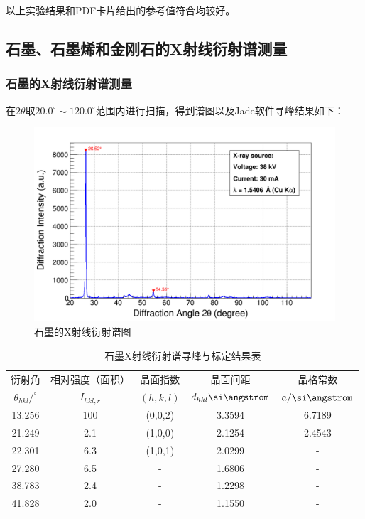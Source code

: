 \documentclass{thuemp}
\begin{document}
以上实验结果和PDF卡片给出的参考值符合均较好。

\subsection{石墨、石墨烯和金刚石的X射线衍射谱测量}

\subsubsection{石墨的X射线衍射谱测量}

在$2\theta$取$20.0^\circ \sim 120.0^\circ$范围内进行扫描，得到谱图以及Jade软件寻峰结果如下：

\begin{figure}[H]
    \centering
    \includegraphics[width=0.8\linewidth]{../Data/C-Graphite-multi.png}
    \caption{石墨的X射线衍射谱图}
    \label{fig:graphite_xrd}
\end{figure}

\begin{table}
    \centering
    \captionnamefont{\wuhao\bf\heiti}
    \captiontitlefont{\wuhao\bf\heiti}
    \caption{石墨X射线衍射谱寻峰与标定结果表}
    \label{tab:graphite_xrd}
    \liuhao
    \begin{tabular}{ccccc}
        \toprule
        衍射角 & 相对强度（面积）& 晶面指数 & 晶面间距 & 晶格常数 \\
        $\theta_{hkl}/^\circ$ & $I_{hkl,r}$ & $(h,k,l)$ & $d_{hkl}\text{\si\angstrom}$ & $a/\text{\si\angstrom}$\\
        \midrule
        13.256 & 100 & (0,0,2) & 3.3594 & 6.7189 \\
        21.249 & 2.1 & (1,0,0) & 2.1254 & 2.4543 \\
        22.301 & 6.3 & (1,0,1) & 2.0299 &   -    \\
        27.280 & 6.5 &    -    & 1.6806 &   -    \\
        38.783 & 2.4 &    -    & 1.2298 &   -    \\
        41.828 & 2.0 &    -    & 1.1550 &   -    \\
        \bottomrule
    \end{tabular}
\end{table}
\end{document}
